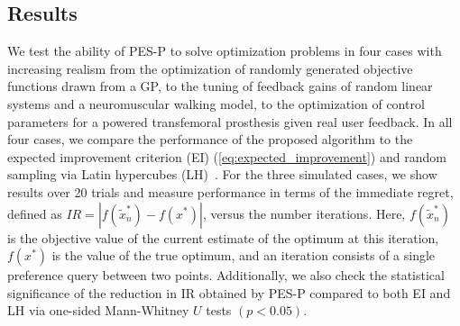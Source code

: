 \subsection{Results}\label{s:results}
We test the ability of PES-P to solve optimization problems in four cases with
increasing realism from the optimization of randomly generated objective
functions drawn from a GP, to the tuning of feedback gains of random linear
systems and a neuromuscular walking model, to the optimization of control
parameters for a powered transfemoral prosthesis given real user feedback. In
all four cases, we compare the performance of the proposed algorithm to the
expected improvement criterion (EI) (\cref{eq:expected_improvement}) and random
sampling via Latin hypercubes (LH)~\citep{mckay2000comparison}. For the three
simulated cases, we show results over 20 trials and measure performance in terms
of the immediate regret, defined as $IR = |f(\tilde x_n^*) - f(x^*)|$, versus
the number iterations.  Here, $f(\tilde x_n^*)$ is the objective value of the
current estimate of the optimum at this iteration, $f(x^*)$ is the value of the
true optimum, and an iteration consists of a single preference query between two
points.  Additionally, we also check the statistical significance of the
reduction in IR obtained by PES-P compared to both EI and LH via one-sided
Mann-Whitney $U$ tests $(p < 0.05)$.

